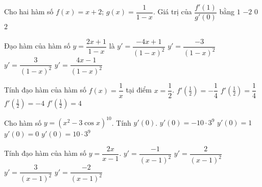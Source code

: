 \begin{ex}%
	Cho hai hàm số $f(x)=x+2$; $g(x)=\dfrac{1}{1-x}$.  Giá trị của $\dfrac{f'(1)}{g'(0)}$ bằng
	 \choice
		{\True $1$} 
		 {$-2$}
		{$0$} 
		 {$2$}
\end{ex}

\begin{ex}%
	Đạo hàm của hàm số $y=\dfrac{2x+1}{1-x}$  là
	\choice 
		{$y'=\dfrac{-4x+1}{(1-x)^2}$} 
		 {$y'=\dfrac{-3}{(1-x)^2}$}
		{\True  $y'=\dfrac{3}{(1-x)^2}$}
		 {$y'=\dfrac{4x-1}{(1-x)^2}$}
\end{ex}

\begin{ex}%
	 Tính đạo hàm của hàm số $f(x)=\dfrac{1}{x}$ tại điểm $x=\dfrac{1}{2}$.
	 \choice
		{$f'(\frac{1}{2})=-\dfrac{1}{4}$} 
		{$f'(\frac{1}{2})=\dfrac{1}{4}$} 
		{\True $f'(\frac{1}{2})=-4$} 
		{$f'(\frac{1}{2})=4$} 
\end{ex}

\begin{ex}%
	Cho hàm số $y=(x^2-3\cos  x)^{10}$. Tính $y'(0)$.
	 \choice
		 {$y'(0)=-10\cdot 3^9$}
		 {$y'(0)=1$}
		{\True $y'(0)=0$} 
		{$y'(0)=10\cdot  3^9$}
\end{ex}

\begin{ex}%
	Tính đạo hàm của hàm số  $y=\dfrac{2x}{x-1}$.
	\choice 
		 {$y'=\dfrac{-1}{(x-1)^2}$}
		 {$y'=\dfrac{2}{(x-1)^2}$}
		{$y'=\dfrac{3}{(x-1)^2}$} 
		 {\True $y'=\dfrac{-2}{(x-1)^2}$}
\end{ex}

